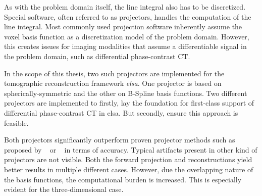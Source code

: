 As with the problem domain itself, the line integral also has to be discretized. Special software,
often referred to as projectors, handles the computation of the line integral. Most commonly used
projection software inherently assume the voxel basis function as a discretization model of the
problem domain. However, this creates issues for imaging modalities that assume a differentiable
signal in the problem domain, such as differential phase-contrast CT\@.

In the scope of this thesis, two such projectors are implemented for the tomographic reconstruction
framework \textit{elsa}. One projector is based on spherically-symmetric and the other on B-Spline
basis functions. Two different projectors are implemented to firstly, lay the foundation for
first-class support of differential phase-contrast CT in elsa. But secondly, ensure this approach is
feasible.

Both projectors significantly outperform proven projector methods such as proposed by
\citeauthor*{siddon_fast_1985}~\cite{siddon_fast_1985} or
\citeauthor*{joseph_improved_1982}~\cite{joseph_improved_1982} in terms of accuracy. Typical
artifacts present in other kind of projectors are not visible. Both the forward projection and
reconstructions yield better results in multiple different cases. However, due the overlapping
nature of the basis functions, the computational burden is increased. This is especially evident for
the three-dimensional case.
